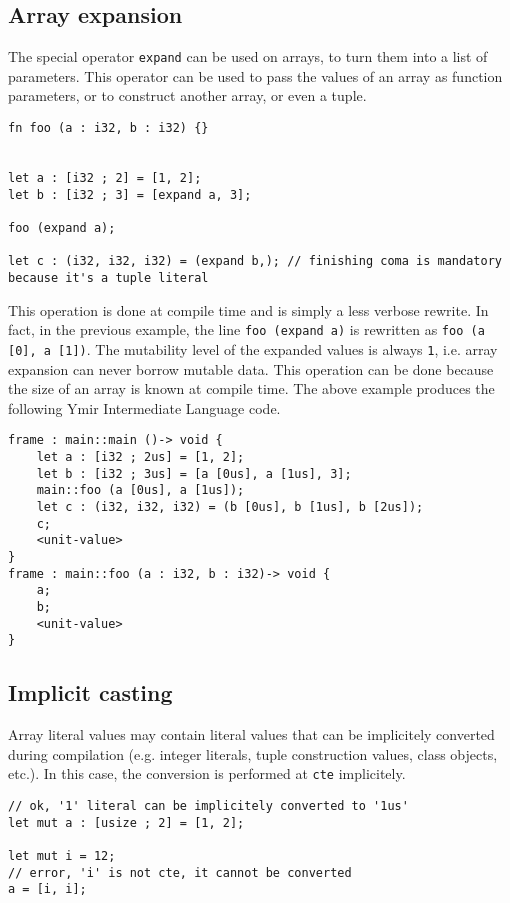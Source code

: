 \subsection {Array expansion}

The special operator \texttt{expand} can be used on arrays, to turn them into a
list of parameters. This operator can be used to pass the values of an array as
function parameters, or to construct another array, or even a tuple.

\begin{lstlisting}[style=coloredverbatim]
fn foo (a : i32, b : i32) {}


let a : [i32 ; 2] = [1, 2];
let b : [i32 ; 3] = [expand a, 3];

foo (expand a);

let c : (i32, i32, i32) = (expand b,); // finishing coma is mandatory because it's a tuple literal
\end{lstlisting}

This operation is done at compile time and is simply a less verbose rewrite. In
fact, in the previous example, the line \texttt{foo (expand a)} is rewritten as
\texttt{foo (a [0], a [1])}. The mutability level of the expanded values is
always \texttt{1}, i.e. array expansion can never borrow mutable data. This
operation can be done because the size of an array is known at compile time. The
above example produces the following Ymir Intermediate Language code.

\begin{lstlisting}[style=intermediateVerb]
frame : main::main ()-> void {
    let a : [i32 ; 2us] = [1, 2];
    let b : [i32 ; 3us] = [a [0us], a [1us], 3];
    main::foo (a [0us], a [1us]);
    let c : (i32, i32, i32) = (b [0us], b [1us], b [2us]);
    c;
    <unit-value>
}
frame : main::foo (a : i32, b : i32)-> void {
    a;
    b;
    <unit-value>
}
\end{lstlisting}


\subsection{Implicit casting}

Array literal values may contain literal values that can be implicitely
converted during compilation (e.g. integer literals, tuple construction values,
class objects, etc.). In this case, the conversion is performed at \texttt{cte}
implicitely.

\begin{lstlisting}[style=coloredverbatim]
// ok, '1' literal can be implicitely converted to '1us'
let mut a : [usize ; 2] = [1, 2];

let mut i = 12;
// error, 'i' is not cte, it cannot be converted
a = [i, i];
\end{lstlisting}


